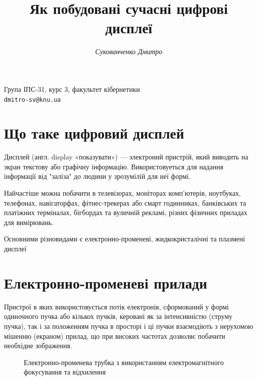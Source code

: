 \documentclass[a4paper]{article}
\begin{document}
\title{Як побудовані сучасні цифрові дисплеї}
\author{\textsl{Сукованченко Дмитро}}
\date{\vspace*{-6ex}}
\maketitle
\begin{center} 
{\small Група ІПС-31, курс 3, факультет кібернетики\\
{\tt dmitro-sv@knu.ua}}
\end{center}


\section{Що таке цифровий дисплей}

Дисплей (англ. display «показувати») — электроний пристрій, який виводить на экран текстову або графічну інформацію. Використовуеться для надання інформації від "заліза" до людини у зрозумілій для неї формі.

Найчастіше можна побачити в телевізорах, моніторах комп'ютерів, ноутбуках, телефонах, навігаторфах, фітнес-трекерах або смарт годинниках, банківських та платіжних терміналах, бігбордах та вуличній рекламі, різних фізичних приладах для вимірювань.

Основними різновидами є електронно-променеві, жидкокристалічні та плазмені дисплеї

\section{Електронно-променеві прилади}

Пристрої в яких використовується потік електронів, сформований у формі одиночного пучка або кількох пучків, керовані як за інтенсивністю (струму пучка), так і за положенням пучка в просторі і ці пучки взаємодіють з нерухомою мішенню (екраном) прилад, що при високих частотах дозволяє побачити необхідне зображення.

\begin{figure}[ht]
\caption{Електронно-променева трубка з використанням електромагнітного фокусування та відхилення}
\end{figure}
\end{document}
